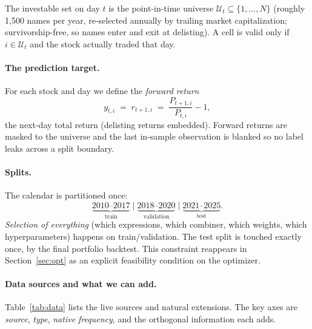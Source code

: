 \documentclass[11pt]{article}
\theoremstyle{definition}
\theoremstyle{plain}
\theoremstyle{remark}
\newcommand{\Uni}{\mathcal{U}}
\begin{document}
The investable set on day $t$ is the point-in-time universe $\Uni_t \subseteq \{1,\dots,N\}$
(roughly 1{,}500 names per year, re-selected annually by trailing market
capitalization; survivorship-free, so names enter and exit at delisting). A cell is
valid only if $i \in \Uni_t$ and the stock actually traded that day.

\paragraph{The prediction target.} For each stock and day we define the
\emph{forward return}
\[
y_{t,i} \;=\; r_{t+1,i} \;=\; \frac{P_{t+1,i}}{P_{t,i}} - 1,
\]
the next-day total return (delisting returns embedded). Forward returns are masked to
the universe and the last in-sample observation is blanked so no label leaks across a
split boundary.

\paragraph{Splits.} The calendar is partitioned once:
\[
\underbrace{2010\text{--}2017}_{\text{train}} \;\big|\;
\underbrace{2018\text{--}2020}_{\text{validation}} \;\big|\;
\underbrace{2021\text{--}2025}_{\text{test}}.
\]
\emph{Selection of everything} (which expressions, which combiner, which weights, which
hyperparameters) happens on train/validation. The test split is touched exactly once,
by the final portfolio backtest. This constraint reappears in Section~\ref{sec:opt} as
an explicit feasibility condition on the optimizer.

\paragraph{Data sources and what we can add.} Table~\ref{tab:data} lists the live
sources and natural extensions. The key axes are \emph{source}, \emph{type},
\emph{native frequency}, and the orthogonal information each adds.
\end{document}
